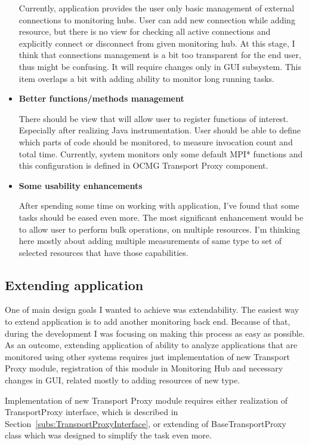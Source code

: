 \begin{itemize}
Currently, application provides the user only basic management of external connections to monitoring hubs. User can add new connection while adding resource, but there is no view for checking all active connections and explicitly connect or disconnect from given monitoring hub. At this stage, I think that connections management is a bit too transparent for the end user, thus might be confusing. It will require changes only in GUI subsystem. This item overlaps a bit with adding ability to monitor long running tasks.

\item{\bf Better functions/methods management}

There should be view that will allow user to register functions of interest. Especially after realizing Java instrumentation. User should be able to define which parts of code should be monitored, to measure invocation count and total time. Currently, system monitors only some default MPI* functions and this configuration is defined in OCMG Transport Proxy component.

\item {\bf Some usability enhancements}

After spending some time on working with application, I\rq{}ve found that some tasks should be eased even more. The most significant enhancement would be to allow user to perform bulk operations, on multiple resources. I\rq{}m thinking here mostly about adding multiple measurements of same type to set of selected resources that have those capabilities. 

\end{itemize}

\subsection{Extending application}

One of main design goals I wanted to achieve was extendability. The easiest way to extend application is to add another monitoring back end. Because of that, during the development I was focusing on making this process as easy as possible. As an outcome, extending application of ability to analyze applications that are monitored using other systems requires just implementation of new Transport Proxy module, registration of this module in Monitoring Hub and necessary changes in GUI, related mostly to adding resources of new type.

Implementation of new Transport Proxy module requires either realization of TransportProxy interface, which is described in Section~\ref{subs:TransportProxyInterface}, or extending of BaseTransportProxy class which was designed to simplify the task even more.

